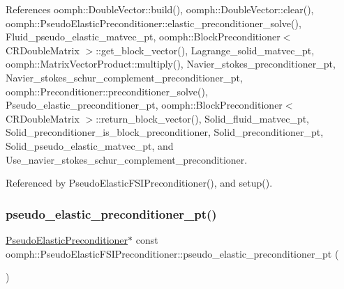 References oomph\+::\+Double\+Vector\+::build(), oomph\+::\+Double\+Vector\+::clear(), oomph\+::\+Pseudo\+Elastic\+Preconditioner\+::elastic\+\_\+preconditioner\+\_\+solve(), Fluid\+\_\+pseudo\+\_\+elastic\+\_\+matvec\+\_\+pt, oomph\+::\+Block\+Preconditioner$<$ C\+R\+Double\+Matrix $>$\+::get\+\_\+block\+\_\+vector(), Lagrange\+\_\+solid\+\_\+matvec\+\_\+pt, oomph\+::\+Matrix\+Vector\+Product\+::multiply(), Navier\+\_\+stokes\+\_\+preconditioner\+\_\+pt, Navier\+\_\+stokes\+\_\+schur\+\_\+complement\+\_\+preconditioner\+\_\+pt, oomph\+::\+Preconditioner\+::preconditioner\+\_\+solve(), Pseudo\+\_\+elastic\+\_\+preconditioner\+\_\+pt, oomph\+::\+Block\+Preconditioner$<$ C\+R\+Double\+Matrix $>$\+::return\+\_\+block\+\_\+vector(), Solid\+\_\+fluid\+\_\+matvec\+\_\+pt, Solid\+\_\+preconditioner\+\_\+is\+\_\+block\+\_\+preconditioner, Solid\+\_\+preconditioner\+\_\+pt, Solid\+\_\+pseudo\+\_\+elastic\+\_\+matvec\+\_\+pt, and Use\+\_\+navier\+\_\+stokes\+\_\+schur\+\_\+complement\+\_\+preconditioner.



Referenced by Pseudo\+Elastic\+F\+S\+I\+Preconditioner(), and setup().

\mbox{\label{classoomph_1_1PseudoElasticFSIPreconditioner_af10b20ad8e90cd99ba35326f1207d6a7}} 
\subsubsection{\texorpdfstring{pseudo\+\_\+elastic\+\_\+preconditioner\+\_\+pt()}{pseudo\_elastic\_preconditioner\_pt()}}
{\footnotesize\ttfamily \hyperlink{classoomph_1_1PseudoElasticPreconditioner}{Pseudo\+Elastic\+Preconditioner}$\ast$ const oomph\+::\+Pseudo\+Elastic\+F\+S\+I\+Preconditioner\+::pseudo\+\_\+elastic\+\_\+preconditioner\+\_\+pt (\begin{DoxyParamCaption}{ }\end{DoxyParamCaption})\hspace{0.3cm}{\ttfamily [inline]}}



